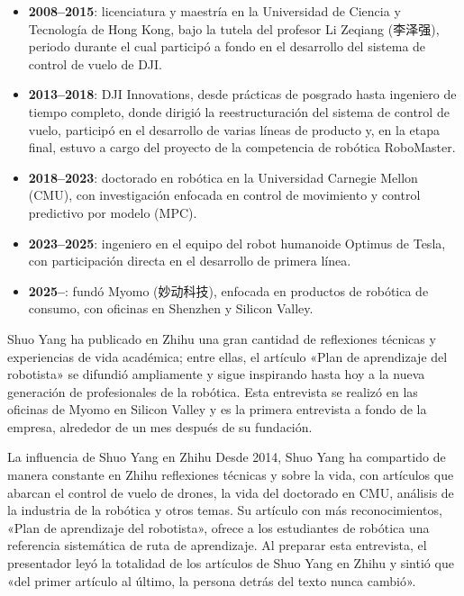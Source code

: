 \documentclass[a4paper]{article}
\begin{document}
\begin{itemize}
    \item \textbf{2008--2015}: licenciatura y maestría en la Universidad de Ciencia y Tecnología de Hong Kong, bajo la tutela del profesor Li Zeqiang (李泽强), periodo durante el cual participó a fondo en el desarrollo del sistema de control de vuelo de DJI.
    \item \textbf{2013--2018}: DJI Innovations, desde prácticas de posgrado hasta ingeniero de tiempo completo, donde dirigió la reestructuración del sistema de control de vuelo, participó en el desarrollo de varias líneas de producto y, en la etapa final, estuvo a cargo del proyecto de la competencia de robótica RoboMaster.
    \item \textbf{2018--2023}: doctorado en robótica en la Universidad Carnegie Mellon (CMU), con investigación enfocada en control de movimiento y control predictivo por modelo (MPC).
    \item \textbf{2023--2025}: ingeniero en el equipo del robot humanoide Optimus de Tesla, con participación directa en el desarrollo de primera línea.
    \item \textbf{2025--}: fundó Myomo (妙动科技), enfocada en productos de robótica de consumo, con oficinas en Shenzhen y Silicon Valley.
\end{itemize}

Shuo Yang ha publicado en Zhihu una gran cantidad de reflexiones técnicas y experiencias de vida académica; entre ellas, el artículo «Plan de aprendizaje del robotista» se difundió ampliamente y sigue inspirando hasta hoy a la nueva generación de profesionales de la robótica. Esta entrevista se realizó en las oficinas de Myomo en Silicon Valley y es la primera entrevista a fondo de la empresa, alrededor de un mes después de su fundación.

\begin{knowledgebox}{La influencia de Shuo Yang en Zhihu}
Desde 2014, Shuo Yang ha compartido de manera constante en Zhihu reflexiones técnicas y sobre la vida, con artículos que abarcan el control de vuelo de drones, la vida del doctorado en CMU, análisis de la industria de la robótica y otros temas. Su artículo con más reconocimientos, «Plan de aprendizaje del robotista», ofrece a los estudiantes de robótica una referencia sistemática de ruta de aprendizaje. Al preparar esta entrevista, el presentador leyó la totalidad de los artículos de Shuo Yang en Zhihu y sintió que «del primer artículo al último, la persona detrás del texto nunca cambió».
\end{knowledgebox}
\end{document}
